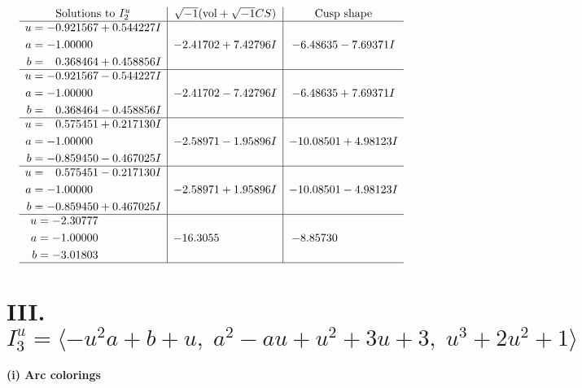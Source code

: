 \documentclass[1p]{elsarticle_modified}
\theoremstyle{definition}
\newcommand{\I}{\sqrt{-1}}
\begin{document}
$$\begin{array}{c|c|c}  
\text{Solutions to }I^u_{2}& \I (\text{vol} + \sqrt{-1}CS) & \text{Cusp shape}\\
 \hline 
\begin{aligned}
u &= -0.921567 + 0.544227 I \\
a &= -1.00000\phantom{ +0.000000I} \\
b &= \phantom{-}0.368464 + 0.458856 I\end{aligned}
 & -2.41702 + 7.42796 I & -6.48635 - 7.69371 I \\ \hline\begin{aligned}
u &= -0.921567 - 0.544227 I \\
a &= -1.00000\phantom{ +0.000000I} \\
b &= \phantom{-}0.368464 - 0.458856 I\end{aligned}
 & -2.41702 - 7.42796 I & -6.48635 + 7.69371 I \\ \hline\begin{aligned}
u &= \phantom{-}0.575451 + 0.217130 I \\
a &= -1.00000\phantom{ +0.000000I} \\
b &= -0.859450 - 0.467025 I\end{aligned}
 & -2.58971 - 1.95896 I & -10.08501 + 4.98123 I \\ \hline\begin{aligned}
u &= \phantom{-}0.575451 - 0.217130 I \\
a &= -1.00000\phantom{ +0.000000I} \\
b &= -0.859450 + 0.467025 I\end{aligned}
 & -2.58971 + 1.95896 I & -10.08501 - 4.98123 I \\ \hline\begin{aligned}
u &= -2.30777\phantom{ +0.000000I} \\
a &= -1.00000\phantom{ +0.000000I} \\
b &= -3.01803\phantom{ +0.000000I}\end{aligned}
 & -16.3055\phantom{ +0.000000I} & -8.85730\phantom{ +0.000000I}\\
 \hline 
 \end{array}$$\newpage\newpage\renewcommand{\arraystretch}{1}
\centering \section*{III. $I^u_{3}= \langle - u^2 a+b+u,\;a^2- a u+u^2+3 u+3,\;u^3+2 u^2+1 \rangle$}
\flushleft \textbf{(i) Arc colorings}\\
\end{document}
